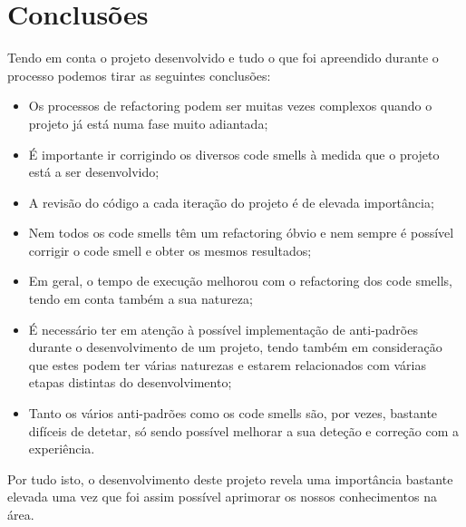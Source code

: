 \section{Conclusões} \label{sec:Conclusao}

Tendo em conta o projeto desenvolvido e tudo o que foi apreendido durante o processo podemos tirar as seguintes conclusões:

\begin{itemize}
    \item Os processos de refactoring podem ser muitas vezes complexos quando o projeto já está numa fase muito adiantada;
    \item É importante ir corrigindo os diversos code smells à medida que o projeto está a ser desenvolvido;
    \item A revisão do código a cada iteração do projeto é de elevada importância;
    \item Nem todos os code smells têm um refactoring óbvio e nem sempre é possível corrigir o code smell e obter os mesmos resultados;
    \item Em geral, o tempo de execução melhorou com o refactoring dos code smells, tendo em conta também a sua natureza;
    \item É necessário ter em atenção à possível implementação de anti-padrões durante o  desenvolvimento de um projeto, tendo também em consideração que estes podem ter várias naturezas e estarem relacionados com várias etapas distintas do desenvolvimento;
    \item Tanto os vários anti-padrões como os code smells são, por vezes, bastante difíceis de detetar, só sendo possível melhorar a sua deteção e correção com a experiência.
\end{itemize}

Por tudo isto, o desenvolvimento deste projeto revela uma importância bastante elevada uma vez que foi assim possível aprimorar os nossos conhecimentos na área. 